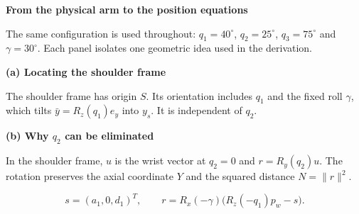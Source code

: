 \documentclass[a4paper,10pt]{article}
\newcommand{\IKPanel}[1]{\resizebox{\linewidth}{!}{}}
\begin{document}
{\Large\bfseries From the physical arm to the position equations}

The same configuration is used throughout:
$q_1=40^\circ$, $q_2=25^\circ$, $q_3=75^\circ$ and $\gamma=30^\circ$.
Each panel isolates one geometric idea used in the derivation.

\begin{minipage}[t]{.485\linewidth}
 {\bfseries (a) Locating the shoulder frame}\par
 \IKPanel{ik_base_frame}
 {\small The shoulder frame has origin $S$. Its orientation includes $q_1$
 and the fixed roll $\gamma$, which tilts $\bar y=R_z(q_1)e_y$ into $y_s$.
 It is independent of $q_2$.}
\end{minipage}\hfill
\begin{minipage}[t]{.485\linewidth}
 {\bfseries (b) Why $q_2$ can be eliminated}\par
 \IKPanel{ik_shoulder_frame}
 {\small In the shoulder frame, $u$ is the wrist vector at $q_2=0$ and
 $r=R_y(q_2)u$. The rotation preserves the axial coordinate $Y$ and the squared
 distance $N=\|r\|^2$.}
\end{minipage}

\vspace{2mm}
\begin{center}
\end{center}
\vspace{-1mm}
\[
 s=(a_1,0,d_1)^T,\qquad
 r=R_x(-\gamma)\bigl(R_z(-q_1)p_w-s\bigr).
\]
\end{document}
